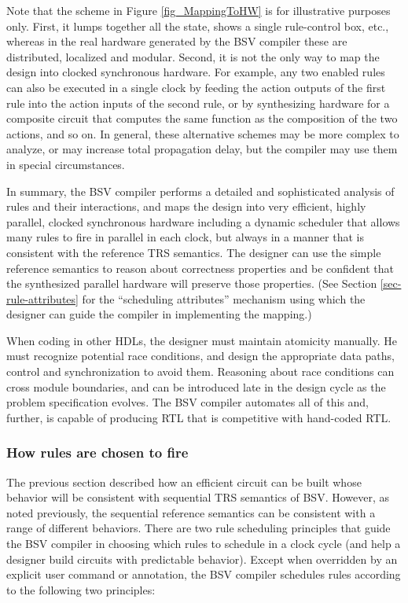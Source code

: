 \documentclass[twoside,letterpaper]{article}
\newcommand{\BSV}{BSV}
\begin{document}
Note that the scheme in Figure \ref{fig_MappingToHW} is for
illustrative purposes only.  First, it lumps together all the state,
shows a single rule-control box, etc., whereas in the real hardware
generated by the {\BSV} compiler these are distributed, localized and
modular.  Second, it is not the only way to map the design into
clocked synchronous hardware.  For example, any two enabled rules can
also be executed in a single clock by feeding the action outputs of
the first rule into the action inputs of the second rule, or by
synthesizing hardware for a composite circuit that computes the same
function as the composition of the two actions, and so on.  In
general, these alternative schemes may be more complex to analyze, or
may increase total propagation delay, but the compiler may use them in
special circumstances.

In summary, the {\BSV} compiler performs a detailed and sophisticated
analysis of rules and their interactions, and maps the design into
very efficient, highly parallel, clocked synchronous hardware
including a dynamic scheduler that allows many rules to fire in
parallel in each clock, but always in a manner that is consistent with
the reference TRS semantics.  The designer can use the simple
reference semantics to reason about correctness properties and be
confident that the synthesized parallel hardware will preserve those
properties. (See Section \ref{sec-rule-attributes} for the
``scheduling attributes'' mechanism using which the designer can guide
the compiler in implementing the mapping.)

When coding in other HDLs, the designer must maintain atomicity
manually.  He must recognize potential race conditions, and design the
appropriate data paths, control and synchronization to avoid them.
Reasoning about race conditions can cross module boundaries, and can
be introduced late in the design cycle as the problem specification
evolves.  The {\BSV} compiler automates all of this and, further, is
capable of producing RTL that is competitive with hand-coded RTL.

\subsubsection{How rules are chosen to fire}
\label{rule-choice}
The previous section described how an efficient circuit can be built
whose behavior will be consistent with sequential TRS semantics of {\BSV}.
However, as noted previously, the sequential reference semantics can be 
consistent with a range of different behaviors. There are two rule 
scheduling principles that guide the {\BSV} compiler in choosing 
which rules to schedule in a clock cycle (and help a designer build
circuits with predictable behavior). Except when overridden by an 
explicit user command or annotation, the {\BSV} compiler schedules 
rules according to the following two principles:
\end{document}
